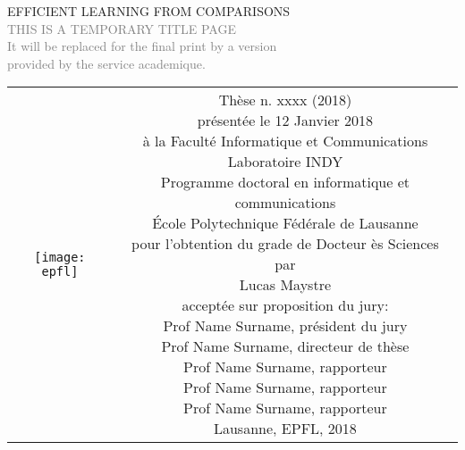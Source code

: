 \begin{titlepage}
\begin{center}
\sffamily


\null\vspace{2cm}
{\huge EFFICIENT LEARNING FROM COMPARISONS} \\[24pt] 
\textcolor{gray}{\small{THIS IS A TEMPORARY TITLE PAGE \\ It will be replaced for the final print by a version \\ provided by the service academique.}}
    
\vfill

\begin{tabular} {cc}
\parbox{0.3\textwidth}{\texttt{[image: epfl]}}
&
\parbox{0.7\textwidth}{%
	Thèse n. xxxx (2018)\\  %
	présentée le 12 Janvier 2018\\  %
	à la Faculté Informatique et Communications\\
	Laboratoire INDY\\
	Programme doctoral en informatique et communications\\
%
	École Polytechnique Fédérale de Lausanne\\[6pt]
	pour l'obtention du grade de Docteur ès Sciences\\
	par\\ [4pt]
	\null \hspace{3em} Lucas Maystre\\[9pt]
%
\small
acceptée sur proposition du jury:\\[4pt]
%
    Prof Name Surname, président du jury\\
    Prof Name Surname, directeur de thèse\\
    Prof Name Surname, rapporteur\\
    Prof Name Surname, rapporteur\\
    Prof Name Surname, rapporteur\\[12pt]
%
Lausanne, EPFL, 2018}
\end{tabular}
\end{center}
\vspace{2cm}
\end{titlepage}
